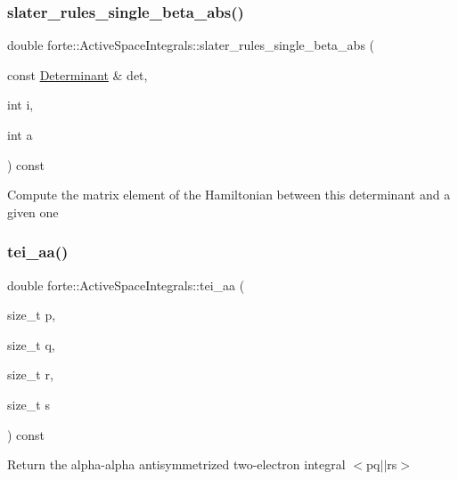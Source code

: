 \subsubsection{\texorpdfstring{slater\+\_\+rules\+\_\+single\+\_\+beta\+\_\+abs()}{slater\_rules\_single\_beta\_abs()}}
{\footnotesize\ttfamily double forte\+::\+Active\+Space\+Integrals\+::slater\+\_\+rules\+\_\+single\+\_\+beta\+\_\+abs (\begin{DoxyParamCaption}\item[{const \mbox{\hyperlink{namespaceforte_a2076c63fd7b8732004d9e1442ce527c1}{Determinant}} \&}]{det,  }\item[{int}]{i,  }\item[{int}]{a }\end{DoxyParamCaption}) const}

Compute the matrix element of the Hamiltonian between this determinant and a given one \mbox{\label{classforte_1_1_active_space_integrals_a41602985b2dd4fb879c21c7aab5d558f}} 
\subsubsection{\texorpdfstring{tei\+\_\+aa()}{tei\_aa()}}
{\footnotesize\ttfamily double forte\+::\+Active\+Space\+Integrals\+::tei\+\_\+aa (\begin{DoxyParamCaption}\item[{size\+\_\+t}]{p,  }\item[{size\+\_\+t}]{q,  }\item[{size\+\_\+t}]{r,  }\item[{size\+\_\+t}]{s }\end{DoxyParamCaption}) const\hspace{0.3cm}{\ttfamily [inline]}}



Return the alpha-\/alpha antisymmetrized two-\/electron integral $<$pq$\vert$$\vert$rs$>$ 

\mbox{\label{classforte_1_1_active_space_integrals_ad54901c053b19691f7920b1dd87e654b}} 
